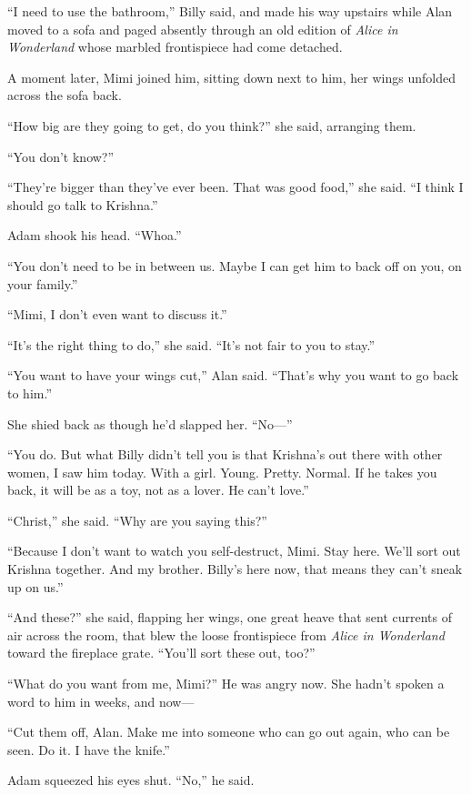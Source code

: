 ``I need to use the bathroom,'' Billy said, and made his way upstairs
while Alan moved to a sofa and paged absently through an old edition
of \textit{Alice in Wonderland} whose marbled frontispiece had come
detached. 

A moment later, Mimi joined him, sitting down next to him, her wings
unfolded across the sofa back.

``How big are they going to get, do you think?'' she said, arranging
them.

``You don't know?''

``They're bigger than they've ever been.  That was good food,'' she
said.  ``I think I should go talk to Krishna.''

Adam shook his head.  ``Whoa.''

``You don't need to be in between us.  Maybe I can get him to back off
on you, on your family.''

``Mimi, I don't even want to discuss it.''

``It's the right thing to do,'' she said.  ``It's not fair to you to
stay.''

``You want to have your wings cut,'' Alan said.  ``That's why you want
to go back to him.''

She shied back as though he'd slapped her.  ``No---''

``You do.  But what Billy didn't tell you is that Krishna's out there
with other women, I saw him today.  With a girl.  Young.  Pretty. 
Normal.  If he takes you back, it will be as a toy, not as a lover. 
He can't love.''

``Christ,'' she said.  ``Why are you saying this?''

``Because I don't want to watch you self-destruct, Mimi.  Stay here. 
We'll sort out Krishna together.  And my brother.  Billy's here now,
that means they can't sneak up on us.''

``And these?'' she said, flapping her wings, one great heave that sent
currents of air across the room, that blew the loose frontispiece from
\textit{Alice in Wonderland} toward the fireplace grate.  ``You'll
sort these out, too?''

``What do you want from me, Mimi?'' He was angry now.  She hadn't
spoken a word to him in weeks, and now---

``Cut them off, Alan.  Make me into someone who can go out again, who
can be seen.  Do it.  I have the knife.''

Adam squeezed his eyes shut.  ``No,'' he said. 

